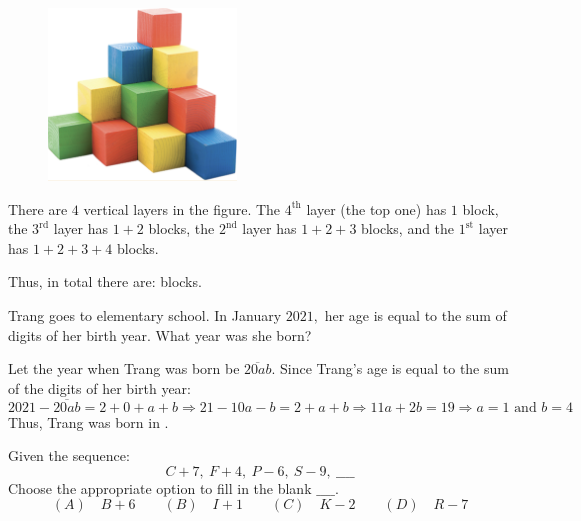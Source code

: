 \documentclass{article}
\begin{document}
\begin{figure}[h]
    \centering
    \begin{minipage}[t]{6.5cm}
        \centering
        \includegraphics[width=5cm]{./png/pi-2022-3-p2.png}
        \caption{}
        \label{fig:pi-2022-3-p2}
    \end{minipage}
\end{figure}

\begin{soln} 
    There are $4$ vertical layers in the figure.
    The $4^{\text{th}}$ layer (the top one) has $1$ block,
    the $3^{\text{rd}}$ layer has $1+2$ blocks,
    the $2^{\text{nd}}$ layer has $1+2+3$ blocks,
    and the $1^{\text{st}}$ layer has $1+2+3+4$ blocks.
    
    Thus, in total there are:  blocks.
\end{soln}

\newpage

\begin{example*}[Problem 3]
    \label{example:pi-2022-3-p3}
    Trang goes to elementary school.
    In January $2021,$ her age is equal to the sum of digits of her birth year.
    What year was she born?
\end{example*}

\begin{soln} 
    Let the year when Trang was born be $\overline{20ab}.$
    Since Trang's age is equal to the sum of the digits of her birth year:
    \[
        2021 - \overline{20ab} = 2 + 0 + a + b
        \Rightarrow 21 - 10a - b = 2+a+b
        \Rightarrow 11a + 2b = 19
        \Rightarrow a = 1 \text{\ and\ } b = 4
    \]
    Thus, Trang was born in .
\end{soln}

\begin{example*}[Problem 4]
    \label{example:pi-2022-3-p4}
    Given the sequence:
    \[ 
        C+7,\  F+4,\  P-6,\  S-9,\  \_\_\_\_
    \]
    Choose the appropriate option to fill in the blank $\_\_\_\_.$
    \[
        (A) \quad B+6 \qquad
        (B) \quad I+1 \qquad
        (C) \quad K-2 \qquad
        (D) \quad R-7
    \]
\end{example*}
\end{document}
